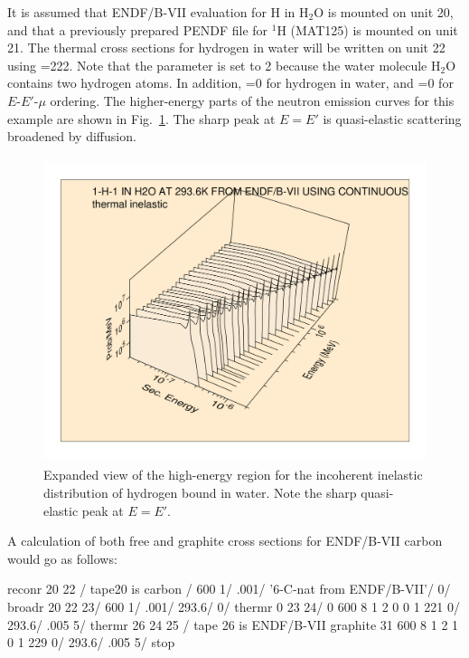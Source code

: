 \noindent
It is assumed that ENDF/B-VII evaluation for H in H$_2$O is
mounted on unit 20, and that a previously prepared PENDF file
for $^1$H (MAT125) is mounted on unit 21.  The thermal cross
sections for hydrogen in water will be written on unit 22
using =222.  Note that the parameter 
is set to 2 because the water molecule H$_2$O contains two
hydrogen atoms.  In addition, =0 for
hydrogen in water, and =0 for $E$-$E'$-$\mu$
ordering.  The higher-energy parts of the neutron emission
curves for this example are shown in Fig.~\ref{water}.  The sharp
peak at $E{=}E'$ is quasi-elastic scattering broadened by
diffusion.

\begin{figure}[thb]\centering
\includegraphics[keepaspectratio, height=3.5in, angle=0]{figs/thermr5ack}
\caption[Incoherent inelastic distribution for H-H$_2$O (expanded view)]
 {Expanded view of the high-energy region for the incoherent inelastic
 distribution of hydrogen bound in water.  Note the sharp quasi-elastic
 peak at $E{=}E'$.}
\label{water}
\end{figure}

A calculation of both free and graphite cross sections for ENDF/B-VII
carbon would go as follows:

\small
\begin{ccode}

 reconr
 20 22 / tape20 is carbon
 /
 600 1/
 .001/
 '6-C-nat from ENDF/B-VII'/
 0/
 broadr
 20 22 23/
 600 1/
 .001/
 293.6/
 0/
 thermr
 0 23 24/
 0 600 8 1 2 0 0 1 221 0/
 293.6/
 .005 5/
 thermr
 26 24 25 / tape 26 is ENDF/B-VII graphite
 31 600 8 1 2 1 0 1 229 0/
 293.6/
 .005 5/
 stop

\end{ccode}
\normalsize

